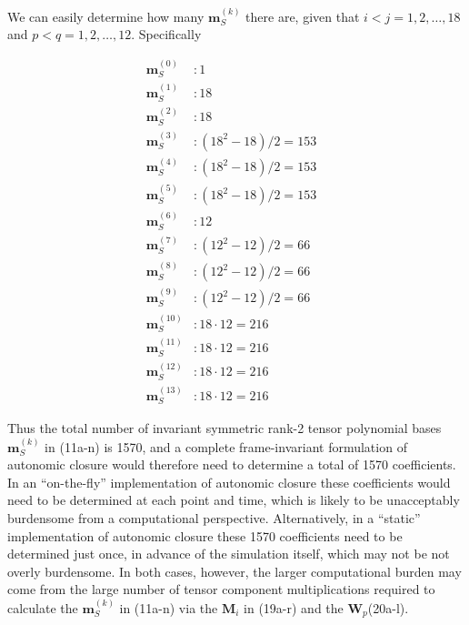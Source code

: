 We can easily determine how many  $\mathbf{m}^{(k)}_S$ there are, given that $i<j=1,2,\ldots,18$ and $p<q=1,2,\ldots,12$.  Specifically  
		 	
%
\begin{subequations}
\begin{align}
	\label{E:39}
	 \mathbf{m}^{(0)}_S   &: 1 	&   	\\  
	 \mathbf{m}^{(1)}_S   &: 18 	&   	\\  
	 \mathbf{m}^{(2)}_S   &: 18 	&   	\\  
	 \mathbf{m}^{(3)}_S   &: (18^2 - 18)/2 = 153 	&   	\\  
	 \mathbf{m}^{(4)}_S   &: (18^2 - 18)/2 = 153  	&   	\\  
	 \mathbf{m}^{(5)}_S   &: (18^2 - 18)/2 = 153  	&   	\\  
	 \mathbf{m}^{(6)}_S   &: 12 	&   	\\  
	 \mathbf{m}^{(7)}_S   &: (12^2 - 12)/2 = 66 	&   	\\ 
	 \mathbf{m}^{(8)}_S   &: (12^2 - 12)/2 = 66 	&   	\\ 
	 \mathbf{m}^{(9)}_S   &: (12^2 - 12)/2 = 66 	&   	\\  
	 \mathbf{m}^{(10)}_S  &: 18 \cdot 12 = 216 	&   	\\ 
	 \mathbf{m}^{(11)}_S  &: 18 \cdot 12 = 216 	&   	\\ 
	 \mathbf{m}^{(12)}_S  &: 18 \cdot 12 = 216 	&   	\\ 
	 \mathbf{m}^{(13)}_S  &: 18 \cdot 12 = 216 	&    
\end{align}
\end{subequations}
%
%    

Thus the total number of invariant symmetric rank-2 tensor polynomial bases $\mathbf{m}^{(k)}_S$  in (11a-n) is 1570, and a complete frame-invariant formulation of autonomic closure would therefore need to determine a total of 1570 coefficients. 
In an ``on-the-fly'' implementation of autonomic closure these coefficients would need to be determined at each point and time, which is likely to be unacceptably burdensome from a computational perspective. Alternatively, in a ``static'' implementation of autonomic closure these 1570 coefficients need to be determined just once, in advance of the simulation itself, which may not be not overly burdensome.  In both cases, however, the larger computational burden may come from the large number of tensor component multiplications required to calculate the $\mathbf{m}^{(k)}_S$  in (11a-n) via the  $\mathbf{M}_i$ in (19a-r) and the $\mathbf{W}_p$(20a-l).


